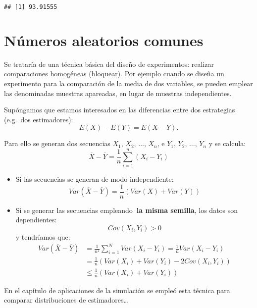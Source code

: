 \documentclass[
]{book}
\theoremstyle{break}
\theoremstyle{definition}
\theoremstyle{definition}
\theoremstyle{definition}
\theoremstyle{remark}
\begin{document}
\begin{verbatim}
## [1] 93.91555
\end{verbatim}

\hypertarget{nuxfameros-aleatorios-comunes}{%
\section{Números aleatorios comunes}\label{nuxfameros-aleatorios-comunes}}

Se trataría de una técnica básica del diseño de experimentos:
realizar comparaciones homogéneas (bloquear).
Por ejemplo cuando se diseña un experimento para la comparación
de la media de dos variables, se pueden emplear las denominadas
muestras apareadas, en lugar de muestras independientes.

Supóngamos que estamos interesados en las diferencias entre dos
estrategias (e.g.~dos estimadores):
\[E\left(  X\right)  -E\left(  Y\right)  =E\left(  X-Y\right).\]

Para ello se generan dos secuencias \(X_{1}\), \(X_{2}\), \(\ldots\),
\(X_{n}\), e \(Y_{1}\), \(Y_{2}\), \(\ldots\), \(Y_{n}\) y se calcula:
\[\overline{X}-\overline{Y}=\frac{1}{n}\sum_{i=1}^{n}\left(  X_{i}-Y_{i}\right)\]

\begin{itemize}
\item
  Si las secuencias se generan de modo independiente:
  \[Var\left( \overline{X} - \overline{Y} \right) 
  = \frac{1}{n} \left( Var\left( X \right) + Var\left( Y \right) \right)\]
\item
  Si se generar las secuencias empleando\textbf{~la misma semilla},
  los datos son dependientes:
  \[Cov\left( X_{i}, Y_{i} \right) > 0\]
  y tendríamos que:
  \[\begin{aligned}
  Var\left( \overline{X}-\overline{Y}\right)  &
  = \frac{1}{n^{2}}\sum_{i=1}^{N}Var\left( X_{i}-Y_{i}\right) 
  = \frac{1}{n}Var\left( X_{i}-Y_{i}\right) \\
  & = \frac{1}{n}\left( Var\left( X_{i} \right) + Var\left( Y_{i} \right)
  - 2Cov\left( X_{i},Y_{i} \right) \right) \\
  & \leq \frac{1}{n}\left( Var\left( X_{i} \right) 
  + Var\left( Y_{i}\right) \right)
  \end{aligned}\]
\end{itemize}

En el capítulo de aplicaciones de la simulación se empleó esta técnica para comparar distribuciones de estimadores\ldots{}
\end{document}

